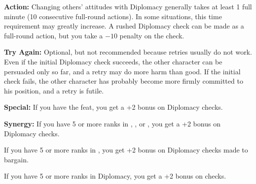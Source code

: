 
\textbf{Action:} Changing others' attitudes with Diplomacy generally takes at least 1 full minute (10 consecutive full-round actions). In some situations, this time requirement may greatly increase. A rushed Diplomacy check can be made as a full-round action, but you take a $-10$ penalty on the check.

\textbf{Try Again:} Optional, but not recommended because retries usually do not work. Even if the initial Diplomacy check succeeds, the other character can be persuaded only so far, and a retry may do more harm than good. If the initial check fails, the other character has probably become more firmly committed to his position, and a retry is futile.

\textbf{Special:} If you have the  feat, you get a +2 bonus on Diplomacy checks.

\textbf{Synergy:} If you have 5 or more ranks in , , or , you get a +2 bonus on Diplomacy checks.

If you have 5 or more ranks in , you get +2 bonus on Diplomacy checks made to bargain.

If you have 5 or more ranks in Diplomacy, you get a +2 bonus on  checks.